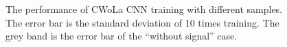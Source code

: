 \documentclass[12pt]{article}
\begin{document}
		\begin{figure}[htpb]
			\centering
			\caption{The performance of CWoLa CNN training with different samples. The error bar is the standard deviation of 10 times training. The grey band is the error bar of the ``without signal'' case.}
			\label{fig:acc_curve_origin_aug_1_res_75_25_new_workflow}
		\end{figure}
\end{document}
